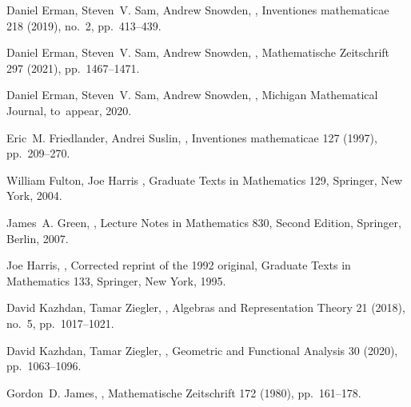 \documentclass{amsart}
\theoremstyle{plain}
\theoremstyle{definition}
\DeclareMathOperator{\GL}{GL}
\begin{document}
\begin{thebibliography}{99}
Daniel Erman, Steven~V. Sam, Andrew Snowden,
,
\newblock Inventiones mathematicae 218 (2019), no.~2, pp.~413--439.

Daniel Erman, Steven~V. Sam, Andrew Snowden,
,
\newblock Mathematische Zeitschrift 297 (2021), pp.~1467--1471.

Daniel Erman, Steven~V. Sam, Andrew Snowden,
,
\newblock Michigan Mathematical Journal, to~appear, 2020.

Eric~M. Friedlander, Andrei Suslin,
,
\newblock Inventiones mathematicae 127 (1997), pp.~209--270.

William Fulton, Joe Harris
,
\newblock Graduate Texts in Mathematics 129, Springer, New York, 2004.

James~A. Green,
\newblock {\em Polynomial representations of {$\GL_n$}},
\newblock Lecture Notes in Mathematics 830, Second Edition, Springer, Berlin, 2007.

Joe Harris,
,
\newblock Corrected reprint of the 1992 original,
\newblock Graduate Texts in Mathematics 133, Springer, New York, 1995.

David Kazhdan, Tamar Ziegler,
,
\newblock Algebras and Representation Theory 21 (2018), no.~5, pp.~1017--1021.

David Kazhdan, Tamar Ziegler,
,
\newblock Geometric and Functional Analysis 30 (2020), pp.~1063--1096.

Gordon~D. James,
,
\newblock Mathematische Zeitschrift 172 (1980), pp.~161--178.

\end{thebibliography}
\end{document}
